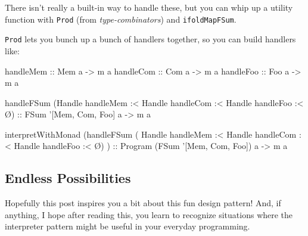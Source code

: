 \documentclass[]{article}
\newenvironment{Shaded}{}{}
\newcommand{\CharTok}[1]{\textcolor[rgb]{0.25,0.44,0.63}{#1}}
\newcommand{\DataTypeTok}[1]{\textcolor[rgb]{0.56,0.13,0.00}{#1}}
\newcommand{\FunctionTok}[1]{\textcolor[rgb]{0.02,0.16,0.49}{#1}}
\newcommand{\KeywordTok}[1]{\textcolor[rgb]{0.00,0.44,0.13}{\textbf{#1}}}
\newcommand{\NormalTok}[1]{#1}
\newcommand{\OtherTok}[1]{\textcolor[rgb]{0.00,0.44,0.13}{#1}}
\begin{document}
There isn't really a built-in way to handle these, but you can whip up a utility
function with \texttt{Prod} (from \emph{type-combinators}) and
\texttt{ifoldMapFSum}.

\begin{Shaded}
\end{Shaded}

\texttt{Prod} lets you bunch up a bunch of handlers together, so you can build
handlers like:

\begin{Shaded}
\begin{Highlighting}[]
\OtherTok{handleMem ::} \DataTypeTok{Mem}\NormalTok{ a }\OtherTok{->}\NormalTok{ m a}
\OtherTok{handleCom ::} \DataTypeTok{Com}\NormalTok{ a }\OtherTok{->}\NormalTok{ m a}
\OtherTok{handleFoo ::} \DataTypeTok{Foo}\NormalTok{ a }\OtherTok{->}\NormalTok{ m a}

\NormalTok{handleFSum (}\DataTypeTok{Handle}\NormalTok{ handleMem }\FunctionTok{:<} \DataTypeTok{Handle}\NormalTok{ handleCom }\FunctionTok{:<} \DataTypeTok{Handle}\NormalTok{ handleFoo }\FunctionTok{:<}\NormalTok{ Ø)}
\OtherTok{    ::} \DataTypeTok{FSum} \CharTok{'[Mem, Com, Foo] a -> m a}

\NormalTok{interpretWithMonad}
\NormalTok{        (handleFSum ( }\DataTypeTok{Handle}\NormalTok{ handleMem}
                   \FunctionTok{:<} \DataTypeTok{Handle}\NormalTok{ handleCom}
                   \FunctionTok{:<} \DataTypeTok{Handle}\NormalTok{ handleFoo}
                   \FunctionTok{:<}\NormalTok{ Ø)}
\NormalTok{        )}
\OtherTok{    ::} \DataTypeTok{Program}\NormalTok{ (}\DataTypeTok{FSum} \CharTok{'[Mem, Com, Foo]) a -> m a}
\end{Highlighting}
\end{Shaded}

\hypertarget{endless-possibilities}{%
\subsection{Endless Possibilities}\label{endless-possibilities}}

Hopefully this post inspires you a bit about this fun design pattern! And, if
anything, I hope after reading this, you learn to recognize situations where the
interpreter pattern might be useful in your everyday programming.
\end{document}
